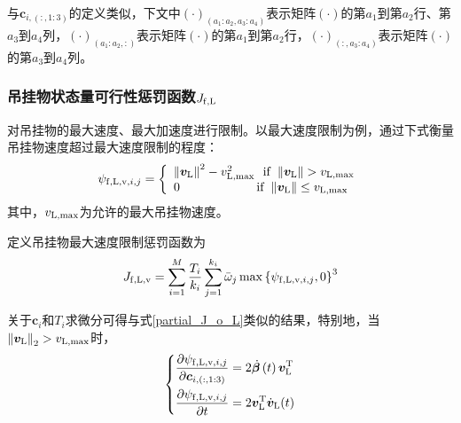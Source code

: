 与$\boldsymbol{c}_{i,(:,1:3)}$的定义类似，下文中$\left(\cdot\right)_{\left(a_1:a_2,a_3:a_4\right)}$表示矩阵$\left(\cdot\right)$的第$a_1$到第$a_2$行、第$a_3$到$a_4$列，$\left(\cdot\right)_{\left(a_1:a_2,:\right)}$表示矩阵$\left(\cdot\right)$的第$a_1$到第$a_2$行，$\left(\cdot\right)_{\left(:,a_3:a_4\right)}$表示矩阵$\left(\cdot\right)$的第$a_3$到$a_4$列。

\subsubsection{吊挂物状态量可行性惩罚函数$J_{\rm{f,L}}$}
对吊挂物的最大速度、最大加速度进行限制。以最大速度限制为例，通过下式衡量吊挂物速度超过最大速度限制的程度：
\begin{equation}\label{psi_f_L_v_i_j}
    \psi_{{\rm{f,L,v}},i,j} = \left\{\begin{array}{l}
        \left\|\boldsymbol{v}_{\rm{L}}\right\|^2 - v_{{\rm{L,max}}}^2 \,\,\,\, {\rm{if}} \,\, \left\|\boldsymbol{v}_{\rm{L}}\right\| > v_{\rm{L},\max}\\
        0 \,\,\,\, \,\,\,\,\,\,\,\,\,\,\, \,\,\,\,\,\,\,\,\,\,\, \,\,\,\,\,\,\,\,\,\,\, {\rm{if}} \,\, \left\|\boldsymbol{v}_{\rm{L}}\right\| \le v_{\rm{L},\max}\\
    \end{array}
    \right.
\end{equation}
其中，$v_{\rm{L,max}}$为允许的最大吊挂物速度。

定义吊挂物最大速度限制惩罚函数为
\begin{equation}\label{J_f_L_v}
    J_{\rm{f,L,v}} =\sum\limits_{i=1}^M\frac{T_i}{k_i}\sum\limits_{j=1}^{k_i}{\Bar{\omega}_j\max\left\{\psi_{{\rm{f,L,v}},i,j},0\right\}^3}
\end{equation}

关于$\boldsymbol{c}_i$和$T_i$求微分可得与式\ref{partial_J_o_L}类似的结果，特别地，当$\left\|\boldsymbol{v}_{\rm{L}}\right\|_2 > v_{\rm{L},\max}$时，
\begin{equation}\label{partial_psi_f_l_v_i_j}
    \left\{\begin{aligned}
        \frac{\partial \psi_{{\rm{f,L,v}},i,j}}{\partial \boldsymbol{c}_{i,(:,1:3)}} &= 2\dot{\boldsymbol{\beta}}\left(t\right) \boldsymbol{v}_{\rm{L}}^{\rm{T}}\\
        \frac{\partial \psi_{{\rm{f,L,v}},i,j}}{\partial t} &= 2\boldsymbol{v}_{\rm{L}}^{\rm{T}}\dot{\boldsymbol{v}}_{\rm{L}}(t)
    \end{aligned}
    \right.
\end{equation}

